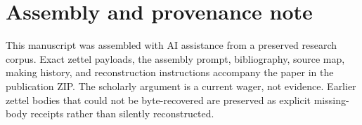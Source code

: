 \documentclass[11pt]{article}
\begin{document}
\appendix
\section{Assembly and provenance note}
This manuscript was assembled with AI assistance from a preserved research corpus. Exact zettel payloads, the assembly prompt, bibliography, source map, making history, and reconstruction instructions accompany the paper in the publication ZIP. The scholarly argument is a current wager, not evidence. Earlier zettel bodies that could not be byte-recovered are preserved as explicit missing-body receipts rather than silently reconstructed.
\end{document}

